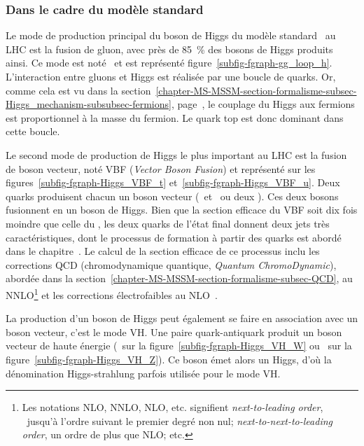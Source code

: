 \subsubsection{Dans le cadre du modèle standard}\label{chapter-MS-MSSM-section-pheno_Higgs_MSSM-subsec-production-SM}
Le mode de production principal du boson de Higgs du modèle standard \higgs\ au LHC est la fusion de gluon, avec près de \SI{85}{\%} des bosons de Higgs produits ainsi.
Ce mode est noté \gluon\gluon\higgs\ et est représenté figure~\ref{subfig-fgraph-gg_loop_h}.
L'interaction entre gluons et Higgs est réalisée par une boucle de quarks.
Or, comme cela est vu dans la section~\ref{chapter-MS-MSSM-section-formalisme-subsec-Higgs_mechanism-subsubsec-fermions}, page~\pageref{chapter-MS-MSSM-section-formalisme-subsec-Higgs_mechanism-subsubsec-fermions}, le couplage du Higgs aux fermions est proportionnel à la masse du fermion.
Le quark top est donc dominant dans cette boucle.
\par Le second mode de production de Higgs le plus important au LHC est la fusion de boson vecteur, noté VBF (\emph{Vector Boson Fusion}) et représenté sur les figures~\ref{subfig-fgraph-Higgs_VBF_t} et~\ref{subfig-fgraph-Higgs_VBF_u}.
Deux quarks produisent chacun un boson vecteur (\Wbosonplus\ et \Wbosonminus\ ou deux \Zboson).
Ces deux bosons fusionnent en un boson de Higgs.
Bien que la section efficace du VBF soit dix fois moindre que celle du \gluon\gluon\higgs, les deux quarks de l'état final donnent deux jets très caractéristiques, dont le processus de formation à partir des quarks est abordé dans le chapitre~.
Le calcul de la section efficace de ce processus inclu les corrections QCD (chromodynamique quantique, \emph{Quantum ChromoDynamic}), abordée dans la section~\ref{chapter-MS-MSSM-section-formalisme-subsec-QCD}, au NNLO\footnote{Les notations NLO, NNLO, NLO, etc. signifient \emph{next-to-leading order}, \ie\ jusqu'à l'ordre suivant le premier degré non nul; \emph{next-to-next-to-leading order}, un ordre de plus que NLO; etc.} et les corrections électrofaibles au NLO~\cite{Higgs_xsec_book_4,PhysRevD.85.035002}.
\par La production d'un boson de Higgs peut également se faire en association avec un boson vecteur, c'est le mode VH.
Une paire quark-antiquark produit un boson vecteur de haute énergie (\Wboson\ sur la figure~\ref{subfig-fgraph-Higgs_VH_W} ou \Zboson\ sur la figure~\ref{subfig-fgraph-Higgs_VH_Z}).
Ce boson émet alors un Higgs, d'où la dénomination \og Higgs-strahlung \fg{} parfois utilisée pour le mode VH.
